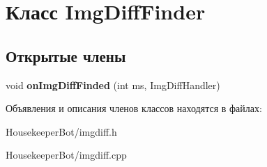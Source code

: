 \hypertarget{classImgDiffFinder}{}\section{Класс Img\+Diff\+Finder}
\label{classImgDiffFinder}
\subsection*{Открытые члены}
\begin{DoxyCompactItemize}
\item 
\mbox{\label{classImgDiffFinder_aa15b9c1049b95ad2ddc32829c6d92376}} 
void {\bfseries on\+Img\+Diff\+Finded} (int ms, Img\+Diff\+Handler)
\end{DoxyCompactItemize}


Объявления и описания членов классов находятся в файлах\+:\begin{DoxyCompactItemize}
\item 
Housekeeper\+Bot/imgdiff.\+h\item 
Housekeeper\+Bot/imgdiff.\+cpp\end{DoxyCompactItemize}
